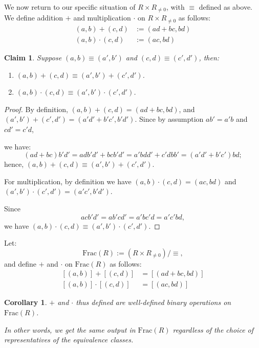 \documentclass[a4paper,12pt]{report}
\newcounter{statement}
\numberwithin{statement}{chapter}
\newtheorem{claim}[statement]{Claim}
\newtheorem{cor}[statement]{Corollary}
\numberwithin{equation}{chapter}
\numberwithin{section}{chapter}
\numberwithin{subsection}{section}
\begin{document}
We now return to our specific situation of $R \times R_{\neq 0}$, with $\equiv$ defined as above.
We define addition $+$ and multiplication $\cdot$ on $R\times R_{\neq 0}$ as follows:
\[
\begin{split}
(a, b) + (c, d) &:= (ad + bc, bd)\\
(a, b)\cdot(c, d) &:= (ac, bd)
\end{split}
\]
\begin{claim}
Suppose $(a, b) \equiv (a', b')$ and $(c, d) \equiv (c', d')$, then:
\begin{enumerate}
\item 
$(a, b) + (c, d) \equiv (a', b') + (c', d')$.

\item 
$(a, b)\cdot(c, d) \equiv (a', b') \cdot (c', d')$.
\end{enumerate}
\end{claim}
\begin{proof}

By definition, $(a, b) + (c, d) = (ad + bc, bd)$,
and $(a', b') + (c', d') = (a'd' + b'c', b'd')$.
Since by assumption $ab' = a'b$ and $cd' = c'd$,


we have:
\[
(ad + bc)b'd' = adb'd' + bcb'd' = a'b dd' + c'd bb' = (a'd' + b'c')bd;
\]
hence, $(a, b) + (c, d) \equiv (a', b') + (c', d')$.


For multiplication, by definition we have $(a, b)\cdot(c, d) = (ac, bd)$
and $(a', b')\cdot(c', d') = (a'c', b'd')$.


Since
\[
acb'd' = ab'cd' = a'bc'd = a'c'bd,
\]
we have $(a, b)\cdot(c, d) \equiv (a', b')\cdot(c', d')$.


\end{proof}

Let:
\[
\mathrm{Frac}(R) := (R \times R_{\neq 0})/\equiv,
\]
and define $+$ and $\cdot$ on $\mathrm{Frac}(R)$ as follows:
\[
\begin{split}
[(a, b)] + [(c, d)] &= [(ad + bc, bd)]\\
[(a, b)]\cdot[(c, d)] &= [(ac, bd)]
\end{split}
\]
\begin{cor}

$+$ and $\cdot$ thus defined are well-defined binary operations on $\mathrm{Frac}(R)$.




In other words, we get the same output in $\mathrm{Frac}(R)$
regardless of the choice of representatives of the equivalence classes.

\end{cor}
\end{document}
